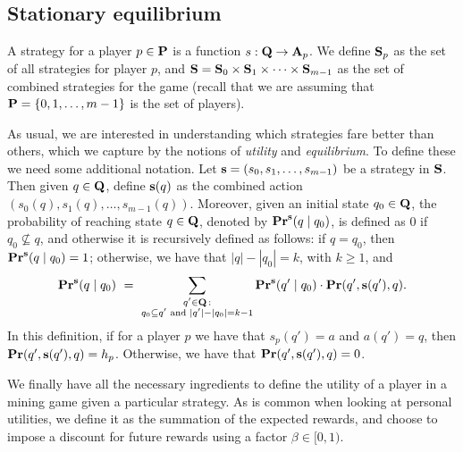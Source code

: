 \subsection{Stationary equilibrium}
A strategy for a player $p \in \mathbf{P}$ is a function $s : \mathbf{Q} \rightarrow \mathbf{A}_p$. 
We define $\mathbf{S}_p$ as the set of all strategies for player $p$, and $\mathbf{S} = \mathbf{S}_0 \times \mathbf{S}_{1} \times \cdots \times \mathbf{S}_{m-1}$ as the set of combined strategies for the game (recall that we are assuming that $\mathbf{P} = \{0, 1, \ldots, m-1\}$ is the set of players). 

As usual, we are interested in understanding which strategies fare better than others, which we capture by the notions of 
\emph{utility} and \emph{equilibrium}. To define these we need some additional notation. 
Let $\mathbf{s} = (s_0, s_1, \ldots, s_{m-1})$ be a strategy in $\mathbf{S}$. Then given $q \in \mathbf{Q}$, define $\mathbf{s}(q)$ as the combined action $(s_0(q), s_1(q), \ldots, s_{m-1}(q))$. Moreover, given an initial state $q_0 \in \mathbf{Q}$, 
the probability of reaching state $q \in \mathbf{Q}$, denoted by $\mathbf{Pr}^{\mathbf{s}}(q \mid q_0)$, is defined as 0 if $q_0 \not\subseteq q$, and otherwise it is recursively defined as follows: if $q =  q_0$, then $\mathbf{Pr}^{\mathbf{s}}(q \mid q_0) = 1$; otherwise, we have that $|q| - |q_0| = k$, with $k \geq 1$, and
\begin{eqnarray*}
\mathbf{Pr}^{\mathbf{s}}(q \mid q_0) \ = \
\sum_{\substack{q' \in \mathbf{Q} \,:\\ q_0 \subseteq q' \text{ and } |q'| - |q_0| = k-1}}
 \mathbf{Pr}^{\mathbf{s}}(q' \mid q_0) \cdot \mathbf{Pr}(q', \mathbf{s}(q'), q).
\end{eqnarray*}
In this definition, if for a player $p$ we have that $s_p(q') = a$ and $a(q') = q$, then $\mathbf{Pr}(q', \mathbf{s}(q'), q) = h_p$. Otherwise, we have that $\mathbf{Pr}(q', \mathbf{s}(q'), q) = 0$. 

We finally have all the necessary ingredients to define the utility of a player in a mining game given a particular strategy. As is common 
when looking at personal utilities, we define it as the summation of the expected rewards, and choose 
to impose a discount for future rewards using a factor $\beta \in [0,1)$. 

